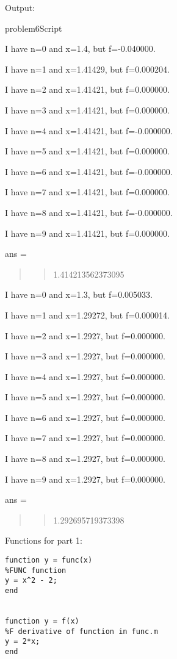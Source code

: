 \documentclass[]{article}
\begin{document}
Output:

problem6Script

I have n=0 and x=1.4, but f=-0.040000.

I have n=1 and x=1.41429, but f=0.000204.

I have n=2 and x=1.41421, but f=0.000000.

I have n=3 and x=1.41421, but f=0.000000.

I have n=4 and x=1.41421, but f=-0.000000.

I have n=5 and x=1.41421, but f=0.000000.

I have n=6 and x=1.41421, but f=-0.000000.

I have n=7 and x=1.41421, but f=0.000000.

I have n=8 and x=1.41421, but f=-0.000000.

I have n=9 and x=1.41421, but f=0.000000.

ans =

\begin{quote}
\begin{quote}
1.414213562373095
\end{quote}
\end{quote}

I have n=0 and x=1.3, but f=0.005033.

I have n=1 and x=1.29272, but f=0.000014.

I have n=2 and x=1.2927, but f=0.000000.

I have n=3 and x=1.2927, but f=0.000000.

I have n=4 and x=1.2927, but f=0.000000.

I have n=5 and x=1.2927, but f=0.000000.

I have n=6 and x=1.2927, but f=0.000000.

I have n=7 and x=1.2927, but f=0.000000.

I have n=8 and x=1.2927, but f=0.000000.

I have n=9 and x=1.2927, but f=0.000000.

ans =

\begin{quote}
\begin{quote}
1.292695719373398
\end{quote}
\end{quote}

Functions for part 1:

\begin{verbatim}
function y = func(x)
%FUNC function
y = x^2 - 2;
end


function y = f(x)
%F derivative of function in func.m
y = 2*x;
end
\end{verbatim}
\end{document}
